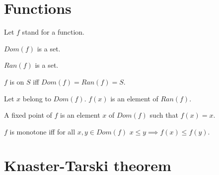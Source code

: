 \documentclass{article}
\begin{document}
  \section{Functions}

  \begin{forthel}

    Let $f$ stand for a function.

    \begin{axiom}
      $Dom(f)$ is a set.
    \end{axiom}

    \begin{signature}[RanSort]
      $Ran(f)$ is a set.
    \end{signature}

    \begin{definition}[DefDom]
      $f$ is on $S$ iff $Dom(f) = Ran(f) = S$.
    \end{definition}

    \begin{axiom}[ImgSort]
      Let $x$ belong to $Dom(f)$. $f(x)$ is an element of $Ran(f)$.
    \end{axiom}

    \begin{definition}[DefFix]
      A fixed point of $f$ is an element $x$ of $Dom(f)$ such that $f(x) = x$.
    \end{definition}

    \begin{definition}[DefMonot]
      $f$ is monotone iff for all $x,y \in Dom(f)$ $x \leq y \implies f(x) \leq f(y)$.
    \end{definition}
  \end{forthel}

  \section{Knaster-Tarski theorem}
\end{document}
